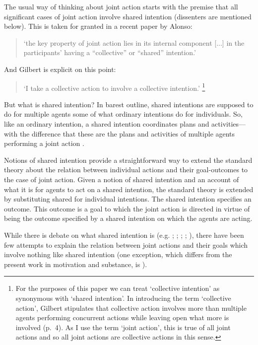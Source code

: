 \documentclass[12pt,a4paper]{extarticle}
\begin{document}
The usual way of thinking about joint action starts with the premise that all significant cases of joint action involve shared intention (dissenters are mentioned below).  This is taken for granted in a recent paper by Alonso:
\begin{quote}
`the key property of joint action lies in its internal component [...] in the participants’ having a “collective” or “shared” intention.' \citep[pp. 444-5]{alonso_shared_2009}
\end{quote}
And Gilbert is explicit on this point:  
\begin{quote} 
`I take a collective action to involve a collective intention.'  \citep[p.\ 5]{Gilbert:2006wr}\footnote{
For the purposes of this paper we can treat `collective intention' as synonymous with `shared intention'.  In introducing the term `collective action', Gilbert stipulates that collective action involves more than multiple agents performing concurrent actions while leaving open what more is involved (p.\ 4).   As I use the term `joint action', this is true of all joint actions and so all joint actions are collective actions in this sense. 
}
\end{quote}
But what is shared intention?  
In barest outline, shared intentions are supposed to do for multiple agents some of what ordinary intentions do for individuals.  So, like an ordinary intention, a shared intention coordinates plans and activities---with the difference that these are the plans and activities of multiple agents performing a joint action \citep{Bratman:1993je}.


Notions of shared intention provide a straightforward way to extend the standard theory about the relation between individual actions and their goal-outcomes to the case of joint action.  
Given a notion of shared intention and an account of what it is for agents to act on a shared intention, 
the standard theory is extended by substituting shared for individual intentions.  The shared intention specifies an outcome.  This outcome is a goal to which the joint action is directed in virtue of being the outcome specified by a shared intention on which the agents are acting.

While there is debate on what shared intention is (e.g. 
	\citealp{Kutz:2000si}; 
	\citealp{Tollefsen:2005vh}; 
	\citealp{gilbert_walking_1990};
	\citealp[pp.\ 74--81]{miller_social_2001};
	\citealp{tuomela_collective_2000}), 
there have been few attempts to explain the relation between joint actions and their goals which involve nothing like shared intention 
(one exception, which differs from the present work in motivation and substance, is \citealp{Roth:2004ki}).
\end{document}
